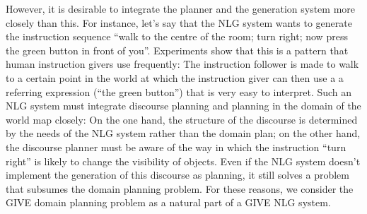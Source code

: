However, it is desirable to integrate the planner and the generation
system more closely than this. For instance, let's say that the NLG
system wants to generate the instruction sequence ``walk to the centre
of the room; turn right; now press the green button in front of you''.
Experiments  show that this is a pattern that human
instruction givers use frequently: The instruction follower is made to
walk to a certain point in the world at which the instruction giver
can then use a a referring expression (``the green button'') that is
very easy to interpret. Such an NLG system must integrate discourse
planning and planning in the domain of the world map closely: On the
one hand, the structure of the discourse is determined by the needs of
the NLG system rather than the domain plan; on the other hand, the
discourse planner must be aware of the way in which the instruction
``turn right'' is likely to change the visibility of objects. Even if
the NLG system doesn't implement the generation of this discourse as
planning, it still solves a problem that subsumes the domain planning
problem. For these reasons, we consider the GIVE domain planning
problem as a natural part of a GIVE NLG system.


